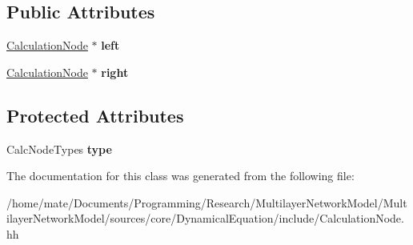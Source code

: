 \subsection*{Public Attributes}
\begin{DoxyCompactItemize}
\item 
\hyperlink{classCalculationNode}{Calculation\+Node} $\ast$ {\bfseries left}\hypertarget{classCalculationNode_ae82c63d4efc74c0b11a00cc06f225629}{}\label{classCalculationNode_ae82c63d4efc74c0b11a00cc06f225629}

\item 
\hyperlink{classCalculationNode}{Calculation\+Node} $\ast$ {\bfseries right}\hypertarget{classCalculationNode_a55560a0b8fa37b8443c908a06d08f087}{}\label{classCalculationNode_a55560a0b8fa37b8443c908a06d08f087}

\end{DoxyCompactItemize}
\subsection*{Protected Attributes}
\begin{DoxyCompactItemize}
\item 
Calc\+Node\+Types {\bfseries type}\hypertarget{classCalculationNode_a9380df8305abde9a1e3a6a3f5fd6dea0}{}\label{classCalculationNode_a9380df8305abde9a1e3a6a3f5fd6dea0}

\end{DoxyCompactItemize}


The documentation for this class was generated from the following file\+:\begin{DoxyCompactItemize}
\item 
/home/mate/\+Documents/\+Programming/\+Research/\+Multilayer\+Network\+Model/\+Multilayer\+Network\+Model/sources/core/\+Dynamical\+Equation/include/Calculation\+Node.\+hh\end{DoxyCompactItemize}
